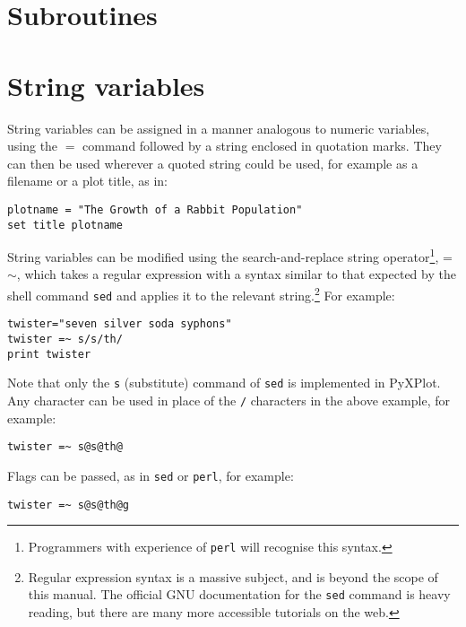 \section{Subroutines}
\label{sec:subroutines}

\section{String variables}
\label{sect:stringvars}

String variables can be assigned in a manner analogous to numeric variables,
using the $=$ command followed by a string enclosed in quotation marks. They can
then be used wherever a quoted string could be used, for example as a filename
or a plot title, as in:

\begin{verbatim}
plotname = "The Growth of a Rabbit Population"
set title plotname
\end{verbatim}

String variables can be modified using the search-and-replace string
operator\footnote{Programmers with
experience of {\tt perl} will recognise this syntax.}, =$\sim$, which takes a regular expression with a syntax similar to that
expected by the shell command {\tt sed} and applies it to the relevant string.\footnote{Regular expression
syntax is a massive subject, and is beyond the scope of this manual. The
official GNU documentation for the {\tt sed} command is heavy reading, but
there are many more accessible tutorials on the web.} For example:

\begin{verbatim}
twister="seven silver soda syphons"
twister =~ s/s/th/
print twister
\end{verbatim}

Note that only the {\tt s} (substitute) command of {\tt sed} is implemented in
PyXPlot. Any character can be used in place of the {\tt /} characters in the
above example, for example:

\begin{verbatim}
twister =~ s@s@th@
\end{verbatim}

\noindent Flags can be passed, as in {\tt sed} or {\tt perl}, for example:

\begin{verbatim}
twister =~ s@s@th@g
\end{verbatim}

